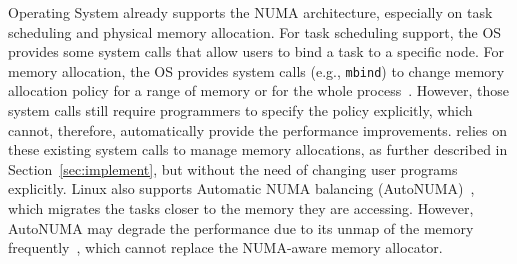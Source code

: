 





Operating System already supports the NUMA architecture, especially on task scheduling and physical memory allocation. For task scheduling support, the OS provides some system calls that allow users to bind a task to a specific node. For memory allocation, the OS provides system calls (e.g., \texttt{mbind}) to change memory allocation policy for a range of memory or for the whole process~\cite{lameter2013numa, diener2015locality}. However, those system calls still require programmers to specify the policy explicitly, which cannot, therefore, automatically provide the performance improvements. \NM{} relies on these existing system calls to manage memory allocations, as further described in Section~\ref{sec:implement}, but without the need of changing user programs explicitly. Linux also supports Automatic NUMA balancing (AutoNUMA)~\cite{AutoNUMA1}, which migrates the tasks closer to the memory they are accessing. However, AutoNUMA may degrade the performance due to its unmap of the memory frequently~\cite{autonumaissue}, which cannot replace the NUMA-aware memory allocator. 

